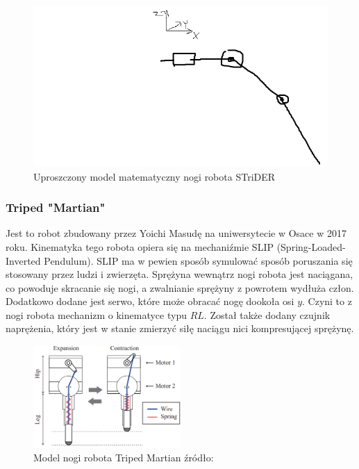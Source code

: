 \documentclass[a4paper,13pt]{article}
\begin{document}
\begin{figure}[H]
\includegraphics[width=\textwidth]{img/strider_math.png}
\caption{Uproszczony model matematyczny nogi robota STriDER}
\label{strider_math}
\end{figure}

\subsubsection{Triped "Martian" }
Jest to robot zbudowany przez Yoichi Masudę na uniwersytecie w Osace w 2017 roku. Kinematyka tego robota opiera się na mechaniźmie SLIP (Spring-Loaded-Inverted Pendulum). SLIP ma w pewien sposób symulować sposób poruszania się stosowany przez ludzi i zwierzęta. Sprężyna wewnątrz nogi robota jest naciągana, co powoduje skracanie się nogi, a zwalnianie sprężyny z powrotem wydłuża człon. Dodatkowo dodane jest serwo, które może obracać nogę dookoła osi $y$. Czyni to z nogi robota mechanizm o kinematyce typu $RL$. Został także dodany czujnik naprężenia, który jest w stanie zmierzyć siłę naciągu nici kompresującej sprężynę. \cite{Triped Martian}\\

\begin{figure}[H]
\includegraphics[width=0.5\textwidth]{img/martian_model.png}
\caption{Model nogi robota Triped Martian źródło: \cite{Triped Martian}}
\label{strider_math}
\end{figure}
\end{document}
